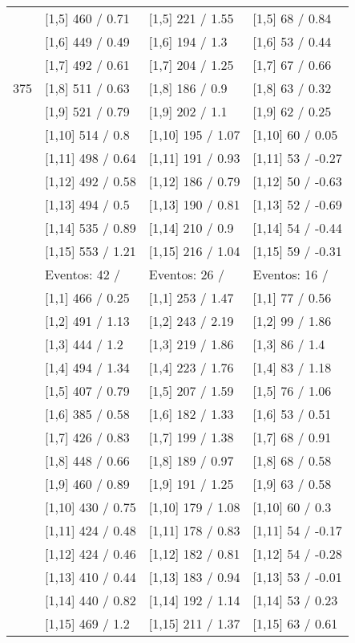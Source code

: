 \begin{table}
\begin{tabular}[t]{llll}
 & {}[1,5] 460  / 0.71 & {}[1,5] 221  / 1.55 & {}[1,5] 68  / 0.84\\
 & {}[1,6] 449  / 0.49 & {}[1,6] 194  / 1.3 & {}[1,6] 53  / 0.44\\
 & {}[1,7] 492  / 0.61 & {}[1,7] 204  / 1.25 & {}[1,7] 67  / 0.66\\
375 & {}[1,8] 511  / 0.63 & {}[1,8] 186  / 0.9 & {}[1,8] 63  / 0.32\\
\addlinespace
 & {}[1,9] 521  / 0.79 & {}[1,9] 202  / 1.1 & {}[1,9] 62  / 0.25\\
 & {}[1,10] 514  / 0.8 & {}[1,10] 195  / 1.07 & {}[1,10] 60  / 0.05\\
 & {}[1,11] 498  / 0.64 & {}[1,11] 191  / 0.93 & {}[1,11] 53  / -0.27\\
 & {}[1,12] 492  / 0.58 & {}[1,12] 186  / 0.79 & {}[1,12] 50  / -0.63\\
 & {}[1,13] 494  / 0.5 & {}[1,13] 190  / 0.81 & {}[1,13] 52  / -0.69\\
\addlinespace
 & {}[1,14] 535  / 0.89 & {}[1,14] 210  / 0.9 & {}[1,14] 54  / -0.44\\
 & {}[1,15] 553  / 1.21 & {}[1,15] 216  / 1.04 & {}[1,15] 59  / -0.31\\
 & Eventos:  42 / & Eventos:  26 / & Eventos:  16 /\\
 & {}[1,1] 466  / 0.25 & {}[1,1] 253  / 1.47 & {}[1,1] 77  / 0.56\\
 & {}[1,2] 491  / 1.13 & {}[1,2] 243  / 2.19 & {}[1,2] 99  / 1.86\\
\addlinespace
 & {}[1,3] 444  / 1.2 & {}[1,3] 219  / 1.86 & {}[1,3] 86  / 1.4\\
 & {}[1,4] 494  / 1.34 & {}[1,4] 223  / 1.76 & {}[1,4] 83  / 1.18\\
 & {}[1,5] 407  / 0.79 & {}[1,5] 207  / 1.59 & {}[1,5] 76  / 1.06\\
 & {}[1,6] 385  / 0.58 & {}[1,6] 182  / 1.33 & {}[1,6] 53  / 0.51\\
 & {}[1,7] 426  / 0.83 & {}[1,7] 199  / 1.38 & {}[1,7] 68  / 0.91\\
\addlinespace
500 & {}[1,8] 448  / 0.66 & {}[1,8] 189  / 0.97 & {}[1,8] 68  / 0.58\\
 & {}[1,9] 460  / 0.89 & {}[1,9] 191  / 1.25 & {}[1,9] 63  / 0.58\\
 & {}[1,10] 430  / 0.75 & {}[1,10] 179  / 1.08 & {}[1,10] 60  / 0.3\\
 & {}[1,11] 424  / 0.48 & {}[1,11] 178  / 0.83 & {}[1,11] 54  / -0.17\\
 & {}[1,12] 424  / 0.46 & {}[1,12] 182  / 0.81 & {}[1,12] 54  / -0.28\\
\addlinespace
 & {}[1,13] 410  / 0.44 & {}[1,13] 183  / 0.94 & {}[1,13] 53  / -0.01\\
 & {}[1,14] 440  / 0.82 & {}[1,14] 192  / 1.14 & {}[1,14] 53  / 0.23\\
 & {}[1,15] 469  / 1.2 & {}[1,15] 211  / 1.37 & {}[1,15] 63  / 0.61\\
\bottomrule
\end{tabular}
\end{table}
